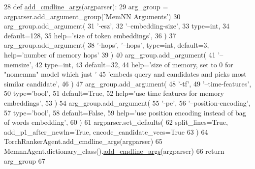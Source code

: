 \begin{DoxyCode}
28     \textcolor{keyword}{def }\hyperlink{namespaceparlai_1_1agents_1_1drqa_1_1config_a62fdd5554f1da6be0cba185271058320}{add\_cmdline\_args}(argparser):
29         arg\_group = argparser.add\_argument\_group(\textcolor{stringliteral}{'MemNN Arguments'})
30         arg\_group.add\_argument(
31             \textcolor{stringliteral}{'-esz'},
32             \textcolor{stringliteral}{'--embedding-size'},
33             type=int,
34             default=128,
35             help=\textcolor{stringliteral}{'size of token embeddings'},
36         )
37         arg\_group.add\_argument(
38             \textcolor{stringliteral}{'-hops'}, \textcolor{stringliteral}{'--hops'}, type=int, default=3, help=\textcolor{stringliteral}{'number of memory hops'}
39         )
40         arg\_group.add\_argument(
41             \textcolor{stringliteral}{'--memsize'},
42             type=int,
43             default=32,
44             help=\textcolor{stringliteral}{'size of memory, set to 0 for "nomemnn" model which just '}
45             \textcolor{stringliteral}{'embeds query and candidates and picks most similar candidate'},
46         )
47         arg\_group.add\_argument(
48             \textcolor{stringliteral}{'-tf'},
49             \textcolor{stringliteral}{'--time-features'},
50             type=\textcolor{stringliteral}{'bool'},
51             default=\textcolor{keyword}{True},
52             help=\textcolor{stringliteral}{'use time features for memory embeddings'},
53         )
54         arg\_group.add\_argument(
55             \textcolor{stringliteral}{'-pe'},
56             \textcolor{stringliteral}{'--position-encoding'},
57             type=\textcolor{stringliteral}{'bool'},
58             default=\textcolor{keyword}{False},
59             help=\textcolor{stringliteral}{'use position encoding instead of bag of words embedding'},
60         )
61         argparser.set\_defaults(
62             split\_lines=\textcolor{keyword}{True}, add\_p1\_after\_newln=\textcolor{keyword}{True}, encode\_candidate\_vecs=\textcolor{keyword}{True}
63         )
64         TorchRankerAgent.add\_cmdline\_args(argparser)
65         MemnnAgent.dictionary\_class().\hyperlink{namespaceparlai_1_1agents_1_1drqa_1_1config_a62fdd5554f1da6be0cba185271058320}{add\_cmdline\_args}(argparser)
66         \textcolor{keywordflow}{return} arg\_group
67 
\end{DoxyCode}
\mbox{\label{classparlai_1_1agents_1_1memnn_1_1memnn_1_1MemnnAgent_a463b88b1d7fc9a7adea9802762c5968c}} 
